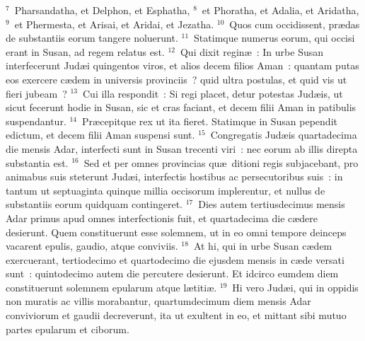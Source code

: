 ${}^{7}$~Pharsandatha, et Delphon, et Esphatha,
${}^{8}$~et Phoratha, et Adalia, et Aridatha,
${}^{9}$~et Phermesta, et Arisai, et Aridai, et Jezatha.
${}^{10}$~Quos cum occidissent, pr\ae das de substantiis eorum tangere noluerunt.
${}^{11}$~Statimque numerus eorum, qui occisi erant in Susan, ad regem relatus est.
${}^{12}$~Qui dixit regin\ae~: In urbe Susan interfecerunt Jud\ae i quingentos viros, et alios decem filios Aman~: quantam putas eos exercere c\ae dem in universis provinciis~? quid ultra postulas, et quid vis ut fieri jubeam~?
${}^{13}$~Cui illa respondit~: Si regi placet, detur potestas Jud\ae is, ut sicut fecerunt hodie in Susan, sic et cras faciant, et decem filii Aman in patibulis suspendantur.
${}^{14}$~Pr\ae cepitque rex ut ita fieret. Statimque in Susan pependit edictum, et decem filii Aman suspensi sunt.
${}^{15}$~Congregatis Jud\ae is quartadecima die mensis Adar, interfecti sunt in Susan trecenti viri~: nec eorum ab illis direpta substantia est.
${}^{16}$~Sed et per omnes provincias qu\ae\ ditioni regis subjacebant, pro animabus suis steterunt Jud\ae i, interfectis hostibus ac persecutoribus suis~: in tantum ut septuaginta quinque millia occisorum implerentur, et nullus de substantiis eorum quidquam contingeret.
${}^{17}$~Dies autem tertiusdecimus mensis Adar primus apud omnes interfectionis fuit, et quartadecima die c\ae dere desierunt. Quem constituerunt esse solemnem, ut in eo omni tempore deinceps vacarent epulis, gaudio, atque conviviis.
${}^{18}$~At hi, qui in urbe Susan c\ae dem exercuerant, tertiodecimo et quartodecimo die ejusdem mensis in c\ae de versati sunt~: quintodecimo autem die percutere desierunt. Et idcirco eumdem diem constituerunt solemnem epularum atque l\ae titi\ae .
${}^{19}$~Hi vero Jud\ae i, qui in oppidis non muratis ac villis morabantur, quartumdecimum diem mensis Adar conviviorum et gaudii decreverunt, ita ut exultent in eo, et mittant sibi mutuo partes epularum et ciborum.



